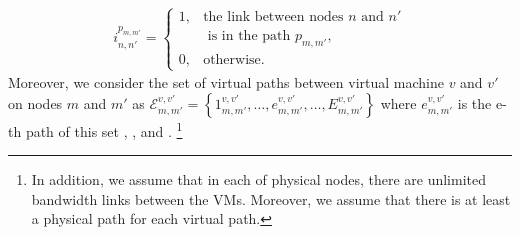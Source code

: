 \documentclass[20pt,twocolumn]{IEEEtran}
\begin{document}
\begin{align}
i^{p_{m,m'}}_{n,n'}=	\begin{cases}
1, & \text{the link between nodes $n$ and $n'$} \\&\text{  is in the path $p_{m,m'},$}
\\
0, & \text{otherwise}.
\end{cases}
\end{align}	
Moreover,  we consider the set of virtual paths  between virtual  machine $v$  and $v'$  on nodes $m$ and $m'$ as  $\mathcal{E}^{v,v'}_{m,m'}=\left\lbrace 1^{v,v'}_{m,m'},\dots,e^{v,v'}_{m,m'}, \dots, E^{v,v'}_{m,m'} \right\rbrace $  where  $e^{v,v'}_{m,m'}$ is the  e-th path of this set \cite{tajiki2018joint}, \cite{ebrahimi2020joint}, and \cite{miotto2019adaptive}. \footnote{ In addition, we assume that in each of physical nodes, there are unlimited bandwidth links between the VMs. Moreover, we assume that there is at least a physical path for each virtual path.}
\end{document}
